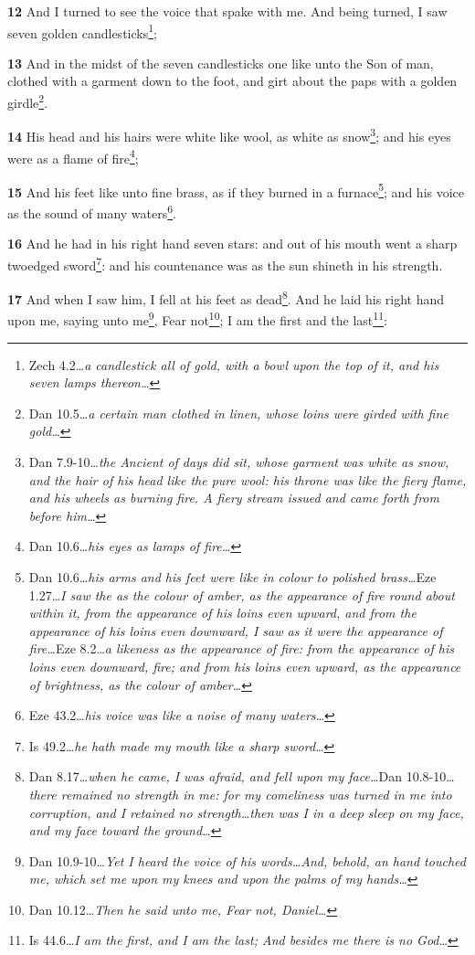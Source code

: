 \documentclass[11pt,a4paper,twocolumn,twoside]{book}
\newcommand{\bibref}[2]{{#1}\ldots\textit{{#2}\ldots}}
\newcommand{\bibfootnote}[2]{\footnote{\bibref{#1}{#2}}}
\newcommand{\dibibref}[4]{\bibref{#1}{#2}\bibref{#3}{#4}}
\newcommand{\dibibfootnote}[4]{\footnote{\dibibref{#1}{#2}{#3}{#4}}}
\newcommand{\tribibref}[6]{\bibref{#1}{#2}\bibref{#3}{#4}\bibref{#5}{#6}}
\newcommand{\tribibfootnote}[6]{\footnote{\tribibref{#1}{#2}{#3}{#4}{#5}{#6}}}
\newcommand{\vn}[1]{{\scriptsize\textbf{#1}}}
\begin{document}
\vn{12} And I turned to see the voice that spake with me. And being turned, I saw seven golden candlesticks\bibfootnote{Zech 4.2}{a candlestick all of gold, with a bowl upon the top of it, and his seven lamps thereon};

\vn{13} And in the midst of the seven candlesticks one like unto the Son of man, clothed with a garment down to the foot, and girt about the paps with a golden girdle\bibfootnote{Dan 10.5}{a certain man clothed in linen, whose loins were girded with fine gold}.

\vn{14} His head and his hairs were white like wool, as white as snow\bibfootnote{Dan 7.9-10}{the Ancient of days did sit, whose garment was white as snow, and the hair of his head like the pure wool: his throne was like the fiery flame, and his wheels as burning fire. A fiery stream issued and came forth from before him}; and his eyes were as a flame of fire\bibfootnote{Dan 10.6}{his eyes as lamps of fire};

\vn{15} And his feet like unto fine brass, as if they burned in a furnace\tribibfootnote{Dan 10.6}{his arms and his feet were like in colour to polished brass}{Eze 1.27}{I saw the as the colour of amber, as the appearance of fire round about within it, from the appearance of his loins even upward, and from the appearance of his loins even downward, I saw as it were the appearance of fire}{Eze 8.2}{a likeness as the appearance of fire: from the appearance of his loins even downward, fire; and from his loins even upward, as the appearance of brightness, as the colour of amber}; and his voice as the sound of many waters\bibfootnote{Eze 43.2}{his voice was like a noise of many waters}.

\vn{16} And he had in his right hand seven stars: and out of his mouth went a sharp twoedged sword\bibfootnote{Is 49.2}{he hath made my mouth like a sharp sword}: and his countenance was as the sun shineth in his strength.

\vn{17} And when I saw him, I fell at his feet as dead\dibibfootnote{Dan 8.17}{when he came, I was afraid, and fell upon my face}{Dan 10.8-10}{there remained no strength in me: for my comeliness was turned in me into corruption, and I retained no strength\ldots then was I in a deep sleep on my face, and my face toward the ground}. And he laid his right hand upon me, saying unto me\bibfootnote{Dan 10.9-10}{Yet I heard the voice of his words\ldots And, behold, an hand touched me, which set me upon my knees and upon the palms of my hands}, Fear not\bibfootnote{Dan 10.12}{Then he said unto me, Fear not, Daniel}; I am the first and the last\bibfootnote{Is 44.6}{I am the first, and I am the last; And besides me there is no God}:
\end{document}
